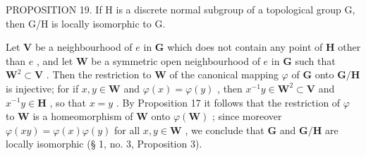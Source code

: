 PROPOSITION 19. If H is a discrete normal subgroup of a topological group G, then G/H is locally isomorphic to G.

Let \(\mathbf{V}\) be a neighbourhood of \(e\) in \(\mathbf{G}\) which does not contain any point of \(\mathbf{H}\) other than \(e\) , and let \(\mathbf{W}\) be a symmetric open neighbourhood of \(e\) in \(\mathbf{G}\) such that \(\mathbf{W}^2 \subset \mathbf{V}\) . Then the restriction to \(\mathbf{W}\) of the canonical mapping \(\varphi\) of \(\mathbf{G}\) onto \(\mathbf{G} / \mathbf{H}\) is injective; for if \(x, y \in \mathbf{W}\) and \(\varphi(x) = \varphi(y)\) , then \(x^{-1}y \in \mathbf{W}^2 \subset \mathbf{V}\) and \(x^{-1}y \in \mathbf{H}\) , so that \(x = y\) . By Proposition 17 it follows that the restriction of \(\varphi\) to \(\mathbf{W}\) is a homeomorphism of \(\mathbf{W}\) onto \(\varphi(\mathbf{W})\) ; since moreover \(\varphi(xy) = \varphi(x)\varphi(y)\) for all \(x, y \in \mathbf{W}\) , we conclude that \(\mathbf{G}\) and \(\mathbf{G} / \mathbf{H}\) are locally isomorphic (§ 1, no. 3, Proposition 3).

